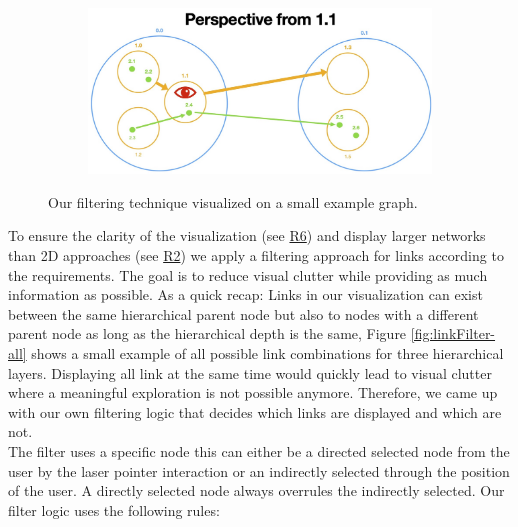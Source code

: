 \begin{figure}[p]
\begin{subfigure}{0.6\columnwidth}
        \label{fig:linkFilter-layer1}
    \end{subfigure}
    \begin{subfigure}{0.6\columnwidth}
        \centering
        \includegraphics[width=\textwidth]{graphics/filterLinks/layer1.jpg}
        \label{fig:linkFilter-layer2}
    \end{subfigure}
    \caption{Our filtering technique visualized on a small example graph.} %
  \end{figure}

To ensure the clarity of the visualization (see \hyperref[req:R6]{R6}) and display larger networks than 2D approaches (see \hyperref[req:R2]{R2}) we apply a filtering approach for links according to the requirements. 
The goal is to reduce visual clutter while providing as much information as possible. 
As a quick recap: Links in our visualization can exist between the same hierarchical parent node but also to nodes with a different parent node as long as the hierarchical depth is the same, Figure \ref{fig:linkFilter-all} shows a small example of all possible link combinations for three hierarchical layers.
Displaying all link at the same time would quickly lead to visual clutter where a meaningful exploration is not possible anymore. 
Therefore, we came up with our own filtering logic that decides which links are displayed and which are not.\\ 
The filter uses a specific node this can either be a directed selected node from the user by the laser pointer interaction or an indirectly selected through the position of the user. A directly selected node always overrules the indirectly selected. Our filter logic uses the following rules:

